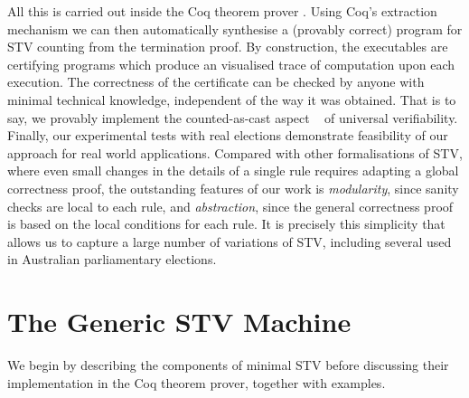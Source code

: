 \documentclass{llncs}
\begin{document}
All this is carried out inside the Coq theorem prover
\cite{Bertot:2004:ITP}.  Using Coq's extraction mechanism
\cite{Letouzey:2003:NEC} we can then automatically synthesise a
(provably correct) program for STV counting from the termination
proof.  
By construction, the executables are certifying programs which
produce an visualised trace of computation upon each execution. The
correctness of the certificate can be checked by anyone with minimal
technical knowledge, independent of the way it was obtained. 
That is to say, we provably implement the counted-as-cast
aspect ~\cite{DBLP:journals/iacr/CortierGKMT16} of universal
verifiability. Finally, our experimental tests with real
elections demonstrate feasibility of our approach for  real world
applications. Compared with other formalisations of STV, where
even small changes in the details of a single rule requires adapting
a global correctness proof, the outstanding features of our work
is \emph{modularity}, since sanity checks are local to each
rule, and \emph{abstraction}, since the general correctness proof is based
on the local conditions for each rule. It is precisely this
simplicity that allows us to capture a large number of variations of STV,
including several used in Australian parliamentary elections.
 





\section{The Generic STV Machine}       
%

We begin by describing the components of minimal STV before
discussing their implementation in the Coq theorem prover, together
with examples. 

\end{document}

